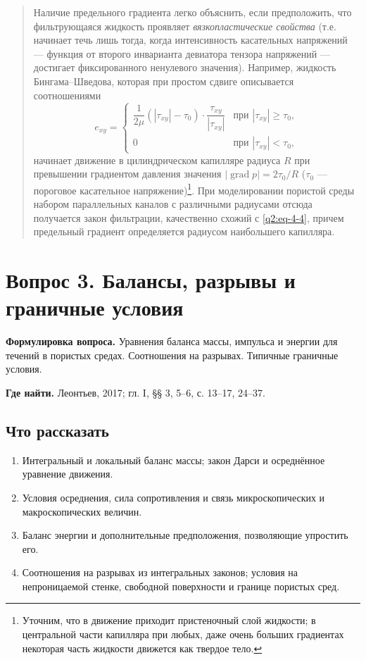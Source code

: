 \documentclass[12pt,a4paper]{article}
\DeclareMathOperator{\grad}{grad}
\newenvironment{textquote}{\begin{quote}\sloppy}{\end{quote}}
\newcounter{questionnumber}
\begin{document}
\begin{textquote}
Наличие предельного градиента легко объяснить, если предположить, что фильтрующаяся жидкость проявляет \textit{вязкопластические свойства} (т.е. начинает течь лишь тогда, когда интенсивность касательных напряжений --- функция от второго инварианта девиатора тензора напряжений --- достигает фиксированного ненулевого значения). Например, жидкость Бингама--Шведова,
которая при простом сдвиге описывается соотношениями
\[
e_{xy}=\begin{cases}
\dfrac{1}{2\mu}(|\tau_{xy}|-\tau_0)\cdot\dfrac{\tau_{xy}}{|\tau_{xy}|}&\text{при }|\tau_{xy}|\geqslant\tau_0,\\[6pt]
0&\text{при }|\tau_{xy}|<\tau_0,
\end{cases}
\]
начинает движение в цилиндрическом капилляре радиуса $R$ при превышении градиентом давления значения $|\grad p|=2\tau_0/R$ ($\tau_0$ --- пороговое касательное напряжение)\footnote[1]{Уточним, что в движение приходит пристеночный слой жидкости; в центральной части капилляра при любых, даже очень больших градиентах некоторая часть жидкости движется как твердое тело.}. При моделировании пористой среды набором параллельных каналов с различными радиусами отсюда получается закон фильтрации, качественно схожий с \eqref{q2:eq-4-4}, причем предельный градиент определяется радиусом наибольшего капилляра.
\end{textquote}
\endgroup

\clearpage
\setcounter{questionnumber}{3}
\setcounter{equation}{0}
\setcounter{footnote}{0}
\section*{Вопрос 3. Балансы, разрывы и граничные условия}
\textbf{Формулировка вопроса.} Уравнения баланса массы, импульса и энергии для течений в пористых средах. Соотношения на разрывах. Типичные граничные условия.

\medskip
\textbf{Где найти.} Леонтьев, 2017; гл. I, §§ 3, 5--6, с. 13--17, 24--37.

\subsection*{Что рассказать}
\begin{enumerate}
\item Интегральный и локальный баланс массы; закон Дарси и осреднённое уравнение движения.
\item Условия осреднения, сила сопротивления и связь микроскопических и макроскопических величин.
\item Баланс энергии и дополнительные предположения, позволяющие упростить его.
\item Соотношения на разрывах из интегральных законов; условия на непроницаемой стенке, свободной поверхности и границе пористых сред.
\end{enumerate}
\end{document}
